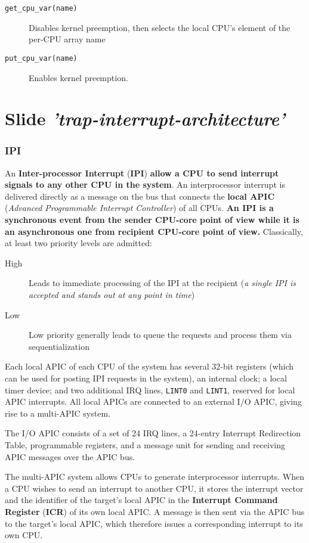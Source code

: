 \documentclass[10pt,a4paper]{article}
\begin{document}
\begin{description}
\item[\texttt{get\_cpu\_var(name)}] Disables kernel preemption, then selects the local CPU’s element of the per-CPU array name
\item[\texttt{put\_cpu\_var(name)}] Enables kernel preemption.
\end{description}


\newpage
\section{Slide \textit{'trap-interrupt-architecture'}}

\subsubsection{IPI}

An \textbf{Inter-processor Interrupt} (\textbf{IPI}) \textbf{allow a CPU to send interrupt signals to any other CPU in the system}. An interprocessor interrupt is delivered directly as a message on the bus that connects the \textbf{local APIC} (\textit{Advanced Programmable Interrupt Controller}) of all CPUs. \textbf{An IPI is a synchronous event from the sender CPU-core point of view while it is an asynchronous one from recipient CPU-core point of view.}
Classically, at least two priority levels are admitted:
\begin{description}
\item[High] Leads to immediate processing of the IPI at the recipient (\textit{a single IPI is accepted and stands out at any point in time})
\item[Low] Low priority generally leads to queue the requests and process them via sequentialization
\end{description}

Each local APIC of each CPU of the system has several 32-bit registers (which can be used for posting IPI requests in the system), an internal clock; a local timer device; and two additional IRQ lines, \texttt{LINT0} and \texttt{LINT1}, reserved for local APIC interrupts. All local APICs are connected to an external I/O APIC, giving rise to a multi-APIC system.

The I/O APIC consists of a set of 24 IRQ lines, a 24-entry Interrupt Redirection Table, programmable registers, and a message unit for sending and receiving APIC messages over the APIC bus.

The multi-APIC system allows CPUs to generate interprocessor interrupts. When a CPU wishes to send an interrupt to another CPU, it stores the interrupt vector and the identifier of the target's local APIC in the \textbf{Interrupt Command Register} (\textbf{ICR}) of its own local APIC. A message is then sent via the APIC bus to the target's local APIC, which therefore issues a corresponding interrupt to its own CPU. 
\end{document}
